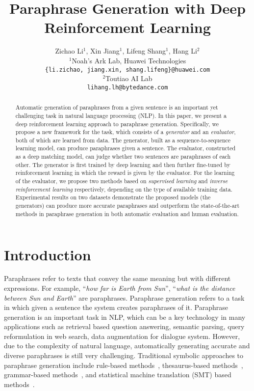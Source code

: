 \documentclass[11pt,a4paper]{article}
\title{Paraphrase Generation with Deep Reinforcement Learning}
\author{\sf Zichao Li$^1$, Xin Jiang$^1$, Lifeng Shang$^1$, Hang Li$^2$\\
$^1$Noah's Ark Lab, Huawei Technologies\\
{\tt \{li.zichao, jiang.xin, shang.lifeng\}@huawei.com}\\
$^2$Toutiao AI Lab\\
{\tt lihang.lh@bytedance.com}}
\date{}
\begin{document}
\maketitle

\begin{abstract}
Automatic generation of paraphrases from a given sentence is an important yet challenging task in natural language processing (NLP). In this paper, we present a deep reinforcement learning approach to paraphrase generation. Specifically, we propose a new framework for the task, which consists of a \textit{generator} and an \textit{evaluator}, both of which are learned from data. The generator, built as a sequence-to-sequence learning model, can produce paraphrases given a sentence. The evaluator, constructed as a deep matching model, can judge whether two sentences are paraphrases of each other. The generator is first trained by deep learning and then further fine-tuned by reinforcement learning in which the reward is given by the evaluator. For the learning of the evaluator, we propose two methods based on \textit{supervised learning} and \textit{inverse reinforcement learning} respectively, depending on the type of available training data. Experimental results on two datasets demonstrate the proposed models (the generators) can produce more accurate paraphrases and outperform the state-of-the-art methods in paraphrase generation in both automatic evaluation and human evaluation.
\end{abstract}

\section{Introduction}
Paraphrases refer to texts that convey the same meaning but with different expressions. For example, ``\textit{how far is Earth from Sun}'', ``\textit{what is the distance between Sun and Earth}'' are paraphrases. Paraphrase generation refers to a task in which given a sentence the system creates paraphrases of it. Paraphrase generation is an important task in NLP, which can be a key technology in many applications such as retrieval based question answering, semantic parsing, query reformulation in web search, data augmentation for dialogue system. However, due to the complexity of natural language, automatically generating accurate and diverse paraphrases is still very challenging.
Traditional symbolic approaches to paraphrase generation include rule-based methods~\citep{mckeown1983paraphrasing}, thesaurus-based methods~\citep{bolshakov2004synonymous,kauchak2006paraphrasing}, grammar-based methods~\citep{narayan2016paraphrase}, and statistical machine translation (SMT) based methods~\citep{quirk2004monolingual,zhao2008combining,zhao2009application}.
\end{document}
